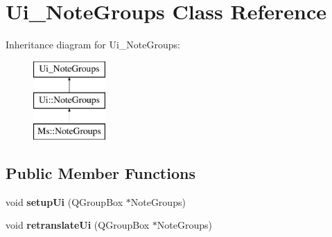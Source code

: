 \hypertarget{class_ui___note_groups}{}\section{Ui\+\_\+\+Note\+Groups Class Reference}
\label{class_ui___note_groups}
Inheritance diagram for Ui\+\_\+\+Note\+Groups\+:\begin{figure}[H]
\begin{center}
\leavevmode
\includegraphics[height=3.000000cm]{class_ui___note_groups}
\end{center}
\end{figure}
\subsection*{Public Member Functions}
\begin{DoxyCompactItemize}
\item 
\mbox{\label{class_ui___note_groups_a371d1827f8e24fd71266cd3a4e2802f5}} 
void {\bfseries setup\+Ui} (Q\+Group\+Box $\ast$Note\+Groups)
\item 
\mbox{\label{class_ui___note_groups_a1113a98d688cb373354524289832b30b}} 
void {\bfseries retranslate\+Ui} (Q\+Group\+Box $\ast$Note\+Groups)
\end{DoxyCompactItemize}
